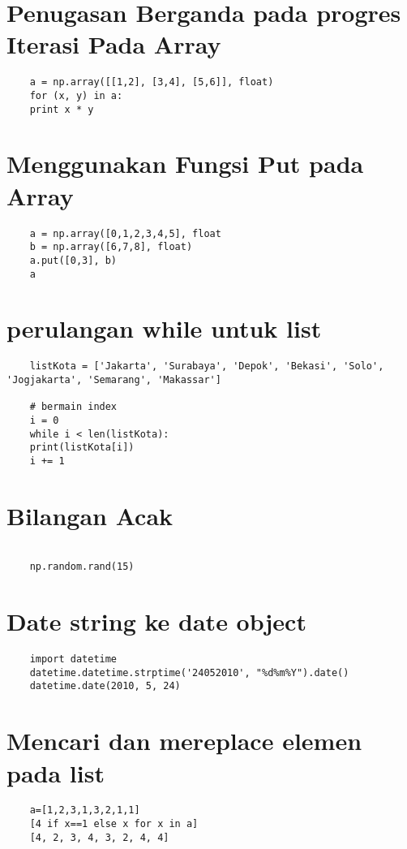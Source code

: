\documentclass[12pt]{article} %
\begin{document}
\section {Penugasan Berganda pada progres Iterasi Pada Array}
\begin{lstlisting}
	a = np.array([[1,2], [3,4], [5,6]], float)
	for (x, y) in a:
	print x * y
\end{lstlisting}

\section {Menggunakan Fungsi Put pada Array}
\begin{lstlisting}
	a = np.array([0,1,2,3,4,5], float
	b = np.array([6,7,8], float)
	a.put([0,3], b)
	a
\end{lstlisting}

\section {perulangan while untuk list}
\begin{lstlisting}
	listKota = ['Jakarta', 'Surabaya', 'Depok', 'Bekasi', 'Solo', 'Jogjakarta', 'Semarang', 'Makassar']
	
	# bermain index
	i = 0
	while i < len(listKota):
	print(listKota[i])
	i += 1
\end{lstlisting}

\section {Bilangan Acak}
\begin{lstlisting}

	np.random.rand(15)

\end{lstlisting}

\section {Date string ke date object}
\begin{lstlisting}
	import datetime
	datetime.datetime.strptime('24052010', "%d%m%Y").date()
	datetime.date(2010, 5, 24)
\end{lstlisting}

\section {Mencari dan mereplace elemen pada list}
\begin{lstlisting}
	a=[1,2,3,1,3,2,1,1]
	[4 if x==1 else x for x in a]
	[4, 2, 3, 4, 3, 2, 4, 4]
\end{lstlisting}
\end{document}
